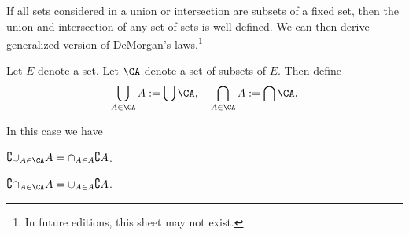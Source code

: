 

If all sets considered in a union or intersection are subsets of a fixed set, then the union and intersection of any set of sets is well defined.
We can then derive generalized version of DeMorgan's laws.\footnote{In future editions, this sheet may not exist.}


Let $E$ denote a set.
Let $\CA$ denote a set of subsets of $E$.
Then define
\[
  \bigcup_{A \in \CA} A := \bigcup \CA, \quad \bigcap_{A \in \CA} A := \bigcap \CA.
\]

In this case we have

\begin{proposition}
  $\complement{\cup_{A \in \CA} A} = \cap_{A \in A} \complement{A}$.
\end{proposition}

\begin{proposition}
  $\complement{\cap_{A \in \CA} A} = \cup_{A \in A} \complement{A}$.
\end{proposition}

\blankpage
